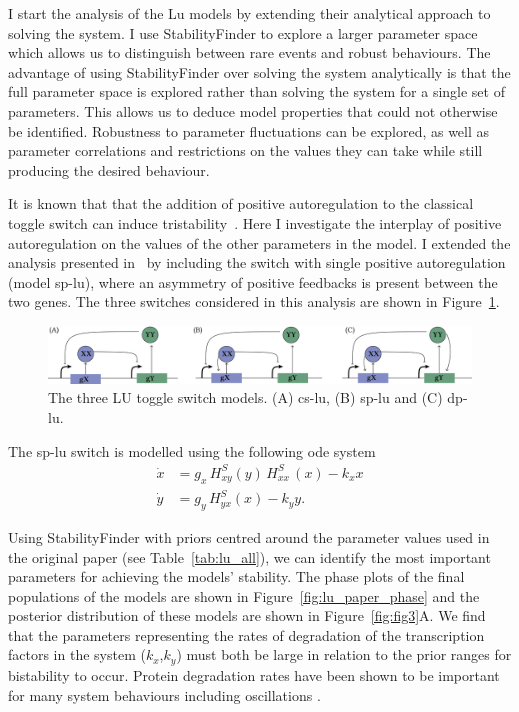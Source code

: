 I start the analysis of the Lu models by extending their analytical approach to solving the system. I use StabilityFinder to explore a larger parameter space which allows us to distinguish between rare events and robust behaviours. The advantage of using StabilityFinder over solving the system analytically is that the full parameter space is explored rather than solving the system for a single set of parameters. This allows us to deduce model properties that could not otherwise be identified. Robustness to parameter fluctuations can be explored, as well as parameter correlations and restrictions on the values they can take while still producing the desired behaviour. 

It is known that that the addition of positive autoregulation to the classical toggle switch can induce tristability~\autocite{Lu:2014kc}. Here I investigate the interplay of positive autoregulation on the values of the other parameters in the model. I extended the analysis presented in~\textcite{Lu:2014kc} by including the switch with single positive autoregulation (model \acrshort{sp-lu}), where an asymmetry of positive feedbacks is present between the two genes. The three switches considered in this analysis are shown in Figure~\ref{fig:lu_mods}.  


\begin{figure}[tb]
\begin{center}
	\includegraphics[width=\textwidth]{../../chapters/chapterStabilityFinder/images/LU_diagrams.png}
	\caption[The three Lu toggle switch models.]{\label{fig:lu_mods} The three LU toggle switch models. (A) \acrshort{cs-lu}, (B) \acrshort{sp-lu} and (C) \acrshort{dp-lu}.   }
\end{center}
\end{figure}


The \acrshort{sp-lu} switch is modelled using the following \acrshort{ode} system
\begin{align}
\dot{x} & = g_{x}\, H^{S}_{xy}(y)\, H^{S}_{xx}\,(x)-k_{x}x \\
\dot{y} & = g_{y}\,H^{S}_{yx}(x) - k_{y}y.
\end{align}


Using StabilityFinder with priors centred around the parameter values used in the original paper (see Table~\ref{tab:lu_all}), we can identify the most important parameters for achieving the models' stability. The phase plots of the final populations of the models are shown in Figure~\ref{fig:lu_paper_phase} and the posterior distribution of these models are shown in Figure~\ref{fig:fig3}A. We find that the parameters representing the rates of degradation of the transcription factors in the system ($k_x$,$k_y$) must both be large in relation to the prior ranges for bistability to occur. Protein degradation rates have been shown to be important for many system behaviours including oscillations \autocite{Woods:2015vu}.

